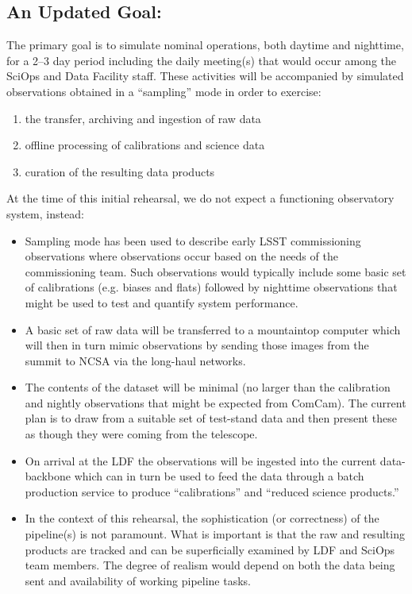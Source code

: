 \subsection{An Updated Goal:}

The primary goal is to simulate nominal operations, both daytime and nighttime, for a 2--3 day 
period including the daily meeting(s) that would occur among the SciOps and 
Data Facility staff.  These activities will be accompanied by simulated 
observations obtained in a ``sampling'' mode in order to exercise:
\begin{enumerate}
\item the transfer, archiving and ingestion of raw data
\item offline processing of calibrations and science data
\item curation of the resulting data products
\end{enumerate}

At the time of this initial rehearsal, we do not expect a functioning 
observatory system, instead:

\begin{itemize}[topsep=0pt]
\item Sampling mode has been used to describe early LSST commissioning 
observations where observations occur based on the needs of the commissioning 
team.  Such observations would typically include some basic set of calibrations
(e.g. biases and flats) followed by nighttime observations that might be used to 
test and quantify system performance.

\item A basic set of raw data will be transferred to a mountaintop computer 
which will then in turn mimic observations by sending those images from the
summit to NCSA via the long-haul networks.

\item The contents of the dataset will be minimal (no larger than the 
calibration and nightly observations that might be expected from ComCam).  
The current plan is to draw from a suitable set of test-stand data and 
then present these as though they were coming from the telescope.

\item On arrival at the LDF the observations will be ingested into the current 
data-backbone which can in turn be used to feed the data through a batch 
production service to produce ``calibrations'' and ``reduced science products.''

\item In the context of this rehearsal, the sophistication (or correctness) 
of the pipeline(s) is not paramount.  What is important is that the raw and 
resulting products are tracked and can be superficially examined by LDF and 
SciOps team members.  The degree of realism would depend on both the data
being sent and availability of working pipeline tasks.
\end{itemize}


